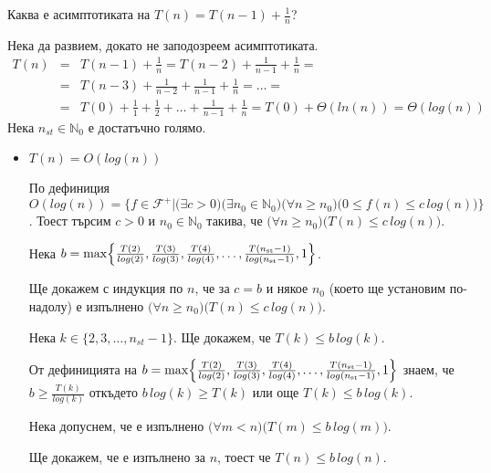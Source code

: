 \begin{problem}
	Каква е асимптотиката на $T(n)=T(n-1)+\frac1n$?
\end{problem}
\begin{solution}
	Нека да развием, докато не заподозреем асимптотиката.
	\begin{eqnarray*}
		T(n)
		&=& T(n-1)+\frac1n=T(n-2)+\frac1{n-1}+\frac1n=\\
		&=& T(n-3)+\frac1{n-2}+\frac1{n-1}+\frac1n=\dots=\\
		&=& T(0)+\frac11+\frac12+\dots+\frac1{n-1}+\frac1n=T(0)+\Theta(ln(n))=\Theta(log(n))
	\end{eqnarray*}
	Нека $n_{st}\in\mathbb{N}_0$ е достатъчно голямо.
	
	\begin{itemize}
		\item $T(n)=O(log(n))$
		
		По $\hyperref[bdef-asymp-classes]{\text{дефиниция}}$ $O(log(n))\!=\!\{f\in\mathscr{F}^+|\big(\exists c>0\big)\big(\exists n_0\in\mathbb{N}_0\big)\big(\forall n\ge n_0\big)\big(0\le f(n)\le c\,log(n)\big)\}$. Тоест търсим $c>0$ и $n_0\in\mathbb{N}_0$ такива, че $\big(\forall n\ge n_0\big)\big(T(n)\le c\,log(n)\big)$.
		
		Нека $b=\max\Bigl\{\frac{T(2)}{log(2)},\frac{T(3)}{log(3)},\frac{T(4)}{log(4)},\dots,\frac{T(n_{\text{st}}-1)}{log({n_{\text{st}}-1)}},1\Bigr\}$.%
		
		Ще докажем с индукция по $n$, че за $c=b$ и някое $n_0$ (което ще установим по-надолу) е изпълнено $\big(\forall n\ge n_0\big)\big(T(n)\le c\,log(n)\big)$.
		
		\begin{base}
			Нека $k\in\{2,3,\dots,n_{st}-1\}$. Ще докажем, че $T(k)\le b\,log(k)$.
			
			От дефиницията на $b=\max\Bigl\{\frac{T(2)}{log(2)},\frac{T(3)}{log(3)},\frac{T(4)}{log(4)},\dots,\frac{T(n_{\text{st}}-1)}{log({n_{\text{st}}-1)}},1\Bigr\}$ знаем, че $b\ge \frac{T(k)}{log(k)}$ откъдето $b\,log(k)\ge T(k)$ или още $T(k)\le b\,log(k)$.
		\end{base}
	
		\begin{indhypothesis}
			Нека допуснем, че е изпълнено $\big(\forall m<n\big)\big(T(m)\le b\,log(m)\big)$.
		\end{indhypothesis}
	
		\begin{indstep}
			Ще докажем, че е изпълнено за $n$, тоест че $T(n)\le b\,log(n)$.
			

\end{indstep}
\end{itemize}
\end{solution}
